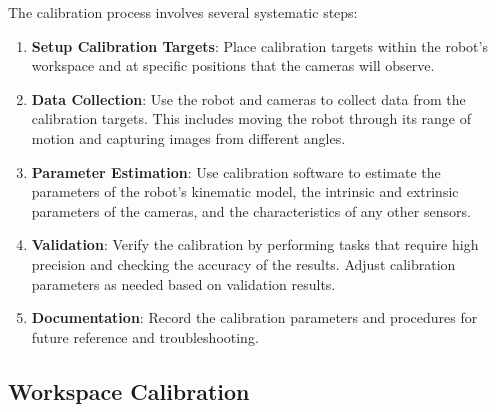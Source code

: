 The calibration process involves several systematic steps:

\begin{enumerate}
    \item \textbf{Setup Calibration Targets}: Place calibration targets within the robot's workspace and at specific positions that the cameras will observe.
    \item \textbf{Data Collection}: Use the robot and cameras to collect data from the calibration targets. This includes moving the robot through its range of motion and capturing images from different angles.
    \item \textbf{Parameter Estimation}: Use calibration software to estimate the parameters of the robot’s kinematic model, the intrinsic and extrinsic parameters of the cameras, and the characteristics of any other sensors.
    \item \textbf{Validation}: Verify the calibration by performing tasks that require high precision and checking the accuracy of the results. Adjust calibration parameters as needed based on validation results.
    \item \textbf{Documentation}: Record the calibration parameters and procedures for future reference and troubleshooting.
\end{enumerate}


\subsection{Workspace Calibration}
\label{subsec:workspace-calibration}



